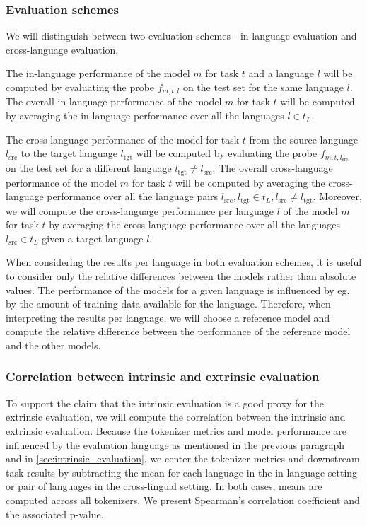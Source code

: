 \subsubsection{Evaluation schemes}

We will distinguish between two evaluation schemes - in-language evaluation and cross-language  evaluation. 

The in-language performance of the model $m$ for task $t$ and a language $l$ will be computed by evaluating the probe $f_{m, t, l}$ on the test set for the same language $l$. 
The overall in-language performance of the model $m$ for task $t$ will be computed by averaging the in-language performance over all the languages $l \in t_L$. 

The cross-language performance of the model for task $t$ from the source language $l_\mathrm{src}$ to the target language $l_\mathrm{tgt}$ will be computed by evaluating the probe $f_{m, t, l_\mathrm{src}}$ on the test set for a different language $l_\mathrm{tgt} \neq l_\mathrm{src}$. 
The overall cross-language performance of the model $m$ for task $t$ will be computed by averaging the cross-language performance over all the language pairs $l_\mathrm{src}, l_\mathrm{tgt} \in t_L, l_\mathrm{src} \neq l_\mathrm{tgt}$.
Moreover, we will compute the cross-language performance per language $l$ of the model $m$ for task $t$ by averaging the cross-language performance over all the languages $l_\mathrm{src} \in t_L$ given a target language $l$.

When considering the results per language in both evaluation schemes, it is useful to consider only the relative differences between the models rather than absolute values. The performance of the models for a given language is influenced by eg. by the amount of training data available for the language. Therefore, when interpreting the results per language, we will choose a reference model and compute the relative difference between the performance of the reference model and the other models.

\subsubsection{Correlation between intrinsic and extrinsic evaluation}

To support the claim that the intrinsic evaluation is a good proxy for the extrinsic evaluation, we will compute the correlation between the intrinsic and extrinsic evaluation. Because the tokenizer metrics and model performance are influenced by the evaluation language as mentioned in the previous paragraph and in \autoref{sec:intrinsic_evaluation}, we center the tokenizer metrics and downstream task results by subtracting the mean for each language in the in-language setting or pair of languages in the cross-lingual setting. In both cases, means are computed across all tokenizers. We present Spearman’s correlation coefficient and the associated p-value.

